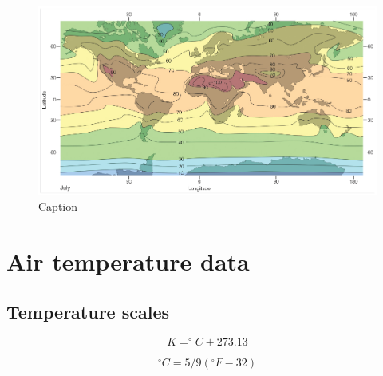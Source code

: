 \documentclass[12pt,oneside]{book}
\begin{document}
\begin{figure}

{\centering \includegraphics[width=1\linewidth]{figures/Figure219} 

}

\caption{Caption}\label{fig:Isotherm2}
\end{figure}

\section{Air temperature data}\label{air-temperature-data}

\subsection{Temperature scales}\label{temperature-scales}

\begin{equation} 
   K = ^{\circ}C + 273.13
   \label{eq:EqK}
\end{equation}

\begin{equation} 
   ^{\circ}C = 5/9 \left(^{\circ}F - 32 \right)
   \label{eq:EqF}
\end{equation}
\end{document}
